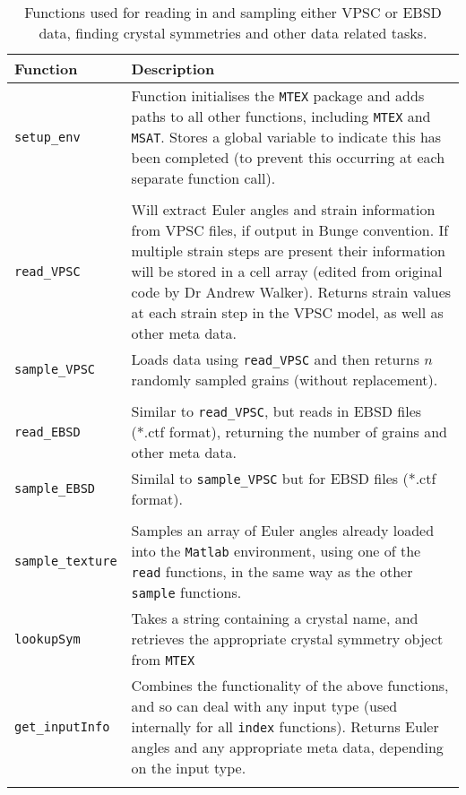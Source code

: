 \documentclass[a4paper,12pt,twoside]{report}
\numberwithin{equation}{chapter}
\begin{document}
\begin{table}[h!] 
	\centering
	\caption[Functions: reading \& sampling]{Functions used for reading in and sampling either VPSC or EBSD data, finding crystal symmetries and other data related tasks.}
	\noindent
	
\begin{tabularx}{\textwidth}{lX}

\hline
\hline
Function    & Description   \\ 
\hline
\hline

\texttt{setup\_{}env} & Function initialises the \texttt{MTEX} package and adds paths to all other functions, including \texttt{MTEX} and \texttt{MSAT}. Stores a global variable to indicate this has been completed (to prevent this occurring at each separate function call). \\  
\\
\hline

\texttt{read\_{}VPSC} & Will extract Euler angles and strain information from VPSC files, if output in Bunge convention. If multiple strain steps are present their information will be stored in a cell array (edited from original code by Dr Andrew Walker). Returns strain values at each strain step in the VPSC model, as well as other meta data. \\ 

\texttt{sample\_{}VPSC} & Loads data using \texttt{read\_{}VPSC} and then returns $n$ randomly sampled grains (without replacement). \\  
\\
\hline

\texttt{read\_{}EBSD} & Similar to \texttt{read\_{}VPSC}, but reads in EBSD files (*.ctf format), returning the number of grains and other meta data. \\

\texttt{sample\_{}EBSD} & Similal to \texttt{sample\_{}VPSC} but for EBSD files (*.ctf format). \\ 
\\
\hline

\texttt{sample\_{}texture} & Samples an array of Euler angles already loaded into the \texttt{Matlab} environment, using one of the \texttt{read} functions, in the same way as the other \texttt{sample} functions. \\

\texttt{lookupSym} & Takes a string containing a crystal name, and retrieves the appropriate crystal symmetry object from \texttt{MTEX} \\

\texttt{get\_{}inputInfo} & Combines the functionality of the above functions, and so can deal with any input type (used internally for all \texttt{index} functions). Returns Euler angles and any appropriate meta data, depending on the input type. \\
\\
\hline
\hline

\end{tabularx}
\label{tab:read_functions}
\end{table}
\end{document}

